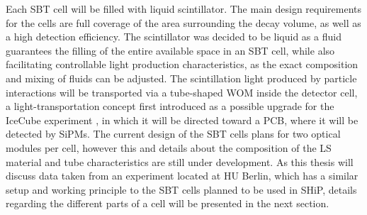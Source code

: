 	Each \ac{SBT} cell will be filled with liquid scintillator. The main design requirements for the cells are full coverage of the area surrounding the decay volume, as well as a high detection efficiency.
	The scintillator was decided to be liquid as a fluid guarantees the filling of the entire available space in an \ac{SBT} cell, while also facilitating controllable light production characteristics, as the exact composition and mixing of fluids can be adjusted.
	The scintillation light produced by particle interactions will be transported via a tube-shaped \acl{WOM} inside the detector cell, a light-transportation concept first introduced as a possible upgrade for the IceCube experiment \cite{ICECUBE}, in which it will be directed toward a \ac{PCB}, where it will be detected by \acsp{SiPM}. 
	The current design of the \ac{SBT} cells plans for two optical modules per cell, however this and details about the composition of the \ac{LS} material and tube characteristics are still under development.
	As this thesis will discuss data taken from an experiment located at \ac{HU} Berlin, which has a similar setup and working principle to the \ac{SBT} cells planned to be used in \ac{SHiP}, details regarding the different parts of a cell will be presented in the next section.
    
	
	



